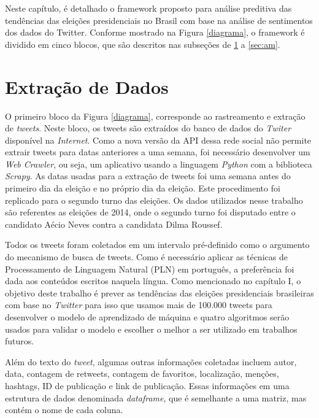 Neste capítulo, é detalhado o framework proposto para análise
preditiva das tendências das eleições presidenciais no Brasil
com base na análise de sentimentos dos dados do Twitter.
Conforme mostrado na Figura \ref{diagrama}, o framework é dividido em
cinco blocos, que são descritos nas subseções de \ref{extract} a \ref{sec:am}.


%


\section{Extração de Dados}
\label{extract}

O primeiro bloco da Figura \ref{diagrama}, corresponde ao rastreamento
e extração de \textit{tweets}. Neste bloco, os tweets são extraídos do
banco de dados do \textit{Twiter} disponível na \textit{Internet}. Como a nova
versão da \acrshort{API} dessa rede social não permite extrair tweets para datas
anteriores a uma semana, foi necessário desenvolver um \textit{Web
Crawler}, ou seja, um aplicativo usando a linguagem \textit{Python}
com a biblioteca \textit{Scrapy}. As datas usadas para a extração de
tweets foi uma semana antes do primeiro dia da eleição e no
próprio dia da eleição. Este procedimento foi replicado para
o segundo turno das eleições. Os dados utilizados nesse trabalho são referentes as eleições de 2014, onde o segundo turno
foi disputado entre o candidato Aécio Neves contra a candidata Dilma Roussef.


Todos os tweets foram coletados em um intervalo pré-definido
como o argumento do mecanismo de busca de tweets.
Como é necessário aplicar as técnicas de Processamento de
Linguagem Natural (PLN) em português, a preferência foi
dada aos conteúdos escritos naquela língua. Como mencionado
no capítulo I, o objetivo deste trabalho é prever as tendências
das eleições presidenciais brasileiras com base no \textit{Twitter} para
isso que usamos mais de 100.000 tweets para desenvolver o
modelo de aprendizado de máquina e quatro algoritmos serão
usados para validar o modelo e escolher o melhor a ser utilizado em trabalhos futuros.

Além do texto do \textit{tweet}, algumas outras informações coletadas
incluem autor, data, contagem de retweets, contagem de
favoritos, localização, menções, hashtags, ID de publicação e
link de publicação. Essas informações em uma estrutura de dados denominada \textit{dataframe}, que é semelhante a uma matriz, mas contém o nome de cada 
coluna.


